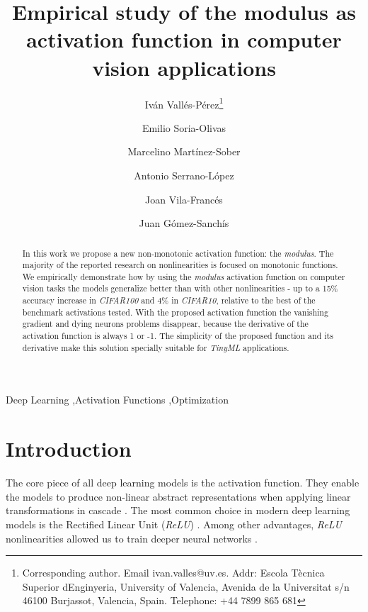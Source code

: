 \documentclass[authoryear]{elsarticle}
\begin{document}
	\begin{frontmatter}
	\title{Empirical study of the modulus as activation function in computer vision applications}
	\author[UV]{Iván Vallés-Pérez\footnote{Corresponding author. Email ivan.valles@uv.es. Addr: Escola Tècnica Superior d\textsc{}Enginyeria, University of Valencia, Avenida de la Universitat s/n 46100 Burjassot, Valencia, Spain.  Telephone: +44 7899 865 681}}
	\author[UV]{Emilio Soria-Olivas}

	\author[UV]{Marcelino Martínez-Sober}%
	\author[UV]{Antonio Serrano-López}
	\author[UV]{Joan Vila-Francés}
	\author[UV]{Juan Gómez-Sanchís}
	
	\address[UV]{IDAL, Intelligent Data Analysis Laboratory, University of Valencia, Avenida de la Universitat s/n 46100 Burjassot, Valencia, Spain. \\ ivan.valles@uv.es, emilio.soria@uv.es, %
		marcelino.martinez@uv.es, antonio.j.serrano@uv.es, joan.vila@uv.es, juan.gomez-sanchis@uv.es %
	}
	
	\begin{abstract}
	In this work we propose a new non-monotonic activation function: the \textit{modulus}. The majority of the reported research on nonlinearities is focused on monotonic functions. We empirically demonstrate how by using the \textit{modulus} activation function on computer vision tasks the models generalize better than with other nonlinearities - up to a 15\% accuracy increase in \textit{CIFAR100} and 4\% in \textit{CIFAR10}, relative to the best of the benchmark activations tested. With the proposed activation function the vanishing gradient and dying neurons problems disappear, because the derivative of the activation function is always 1 or -1. The simplicity of the proposed function and its derivative make this solution specially suitable for \textit{TinyML} applications. 
	\end{abstract}
	
	\begin{keyword}
		Deep Learning \sep Activation Functions \sep Optimization
	\end{keyword}
	
\end{frontmatter}

\linenumbers

\section{Introduction}
The core piece of all deep learning models is the activation function. They enable the models to produce non-linear abstract representations when applying linear transformations in cascade \citep{goodfellow2016}. The most common choice in modern deep learning models is the Rectified Linear Unit (\textit{ReLU}) \citep{nair2010}. Among other advantages, \textit{ReLU} nonlinearities allowed us to train deeper neural networks \citep{xu2015}.
\end{document}
